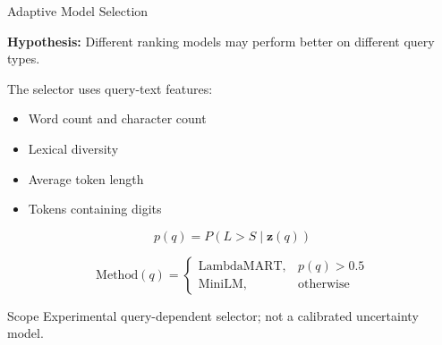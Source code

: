 \documentclass[aspectratio=169,11pt]{beamer}
\begin{document}
\begin{frame}{Adaptive Model Selection}

\textbf{Hypothesis:}
Different ranking models may perform
better on different query types.

\vspace{0.3cm}

The selector uses query-text features:

\begin{itemize}
\item Word count and character count
\item Lexical diversity
\item Average token length
\item Tokens containing digits
\end{itemize}

\[
p(q)=P(L>S\mid\mathbf{z}(q))
\]

\[
\mathrm{Method}(q)=
\begin{cases}
\mathrm{LambdaMART},&p(q)>0.5\\
\mathrm{MiniLM},&\text{otherwise}
\end{cases}
\]

\begin{alertblock}{Scope}
Experimental query-dependent selector;
not a calibrated uncertainty model.
\end{alertblock}

\end{frame}
\end{document}
